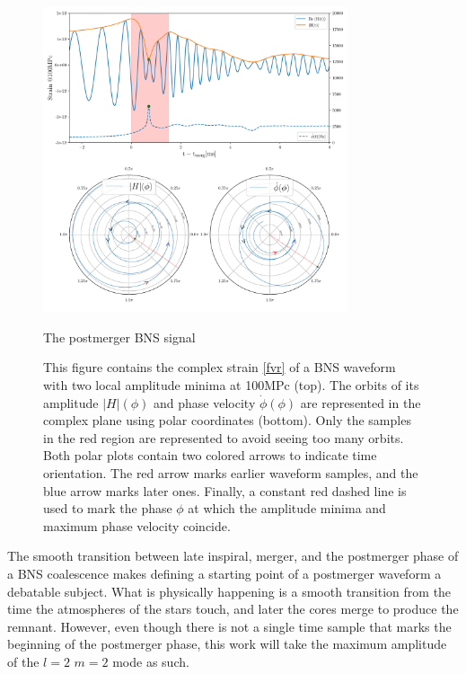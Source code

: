 \begin{figure}[hbt!]
\begin{center}
\includegraphics[width=0.8\textwidth, angle=0]{images/Data_analysis/results/postm_wf.pdf}
\end{center}
\captionsetup{width=0.8\textwidth}
\caption{The postmerger BNS signal}
\caption*{This figure contains the complex strain \ref{fvr} of a BNS waveform \cite{Dietrich:2018phi} with two local amplitude minima at 100MPc (top). The orbits of its amplitude $|H|(\phi)$ and phase velocity $\dot{\phi}(\phi)$ are represented in the complex plane using polar coordinates (bottom). Only the samples in the red region are represented to avoid seeing too many orbits.
Both polar plots contain two colored arrows to indicate time orientation. The red arrow marks earlier waveform samples, and the blue arrow marks later ones. Finally, a constant red dashed line is used to mark the phase $\phi$ at which the amplitude minima and maximum phase velocity coincide.}
\label{fig:9} 
\end{figure}

\FloatBarrier

The smooth transition between late inspiral, merger, and the postmerger phase of a BNS coalescence makes defining a starting point of a postmerger waveform a debatable subject. What is physically happening is a smooth transition from the time the atmospheres of the stars touch, and later the cores merge to produce the remnant. However, even though there is not a single time sample that marks the beginning of the postmerger phase, this work will take the maximum amplitude of the $l=2$ $m=2$ mode as such. 

